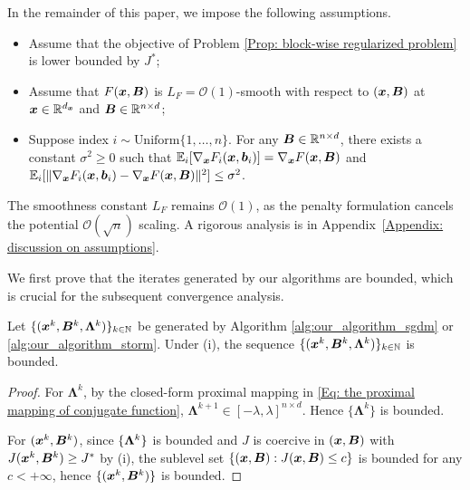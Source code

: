 In the remainder of this paper, we impose the following assumptions.
\begin{assumption} 
\label{Ass: main assumptions}
\begin{itemize}[leftmargin=2em]
    \item[{(i)}] Assume that the objective of Problem \eqref{Prop: block-wise regularized problem} is lower bounded by \(J^*\); 
    \item[{(ii)}] Assume that \(F(\bm{x}, \bm{B})\) is $L_F=\mathcal{O}(1)$-smooth with respect to $(\bm{x}, \bm{B})$ at \(\bm{x} \in \mathbb{R}^{d_{\bm{x}}}\) and \(\bm{B} \in \mathbb{R}^{n\times d}\); 
    \item[{(iii)}] Suppose index $i \sim \text{Uniform}\{1, \ldots, n\}$.  For any \(\bm{B} \in \mathbb{R}^{n\times d}\), there exists a constant $\sigma^2 \geq 0$ such that $\mathbb{E}_{i}[\nabla_{\bm{x}} F_i(\bm{x}, \bm{b}_i)] = \nabla_{\bm{x}} F(\bm{x}, \bm{B})$ and $\mathbb{E}_{i}[\|\nabla_{\bm{x}} F_i(\bm{x}, \bm{b}_i) - \nabla_{\bm{x}} F(\bm{x}, \bm{B})\|^2] \leq \sigma^2$. 
\end{itemize}
\end{assumption}
\begin{remark}
The smoothness constant $L_F$ remains 
$\mathcal{O}(1)$, as the penalty formulation cancels the potential 
$\mathcal{O}(\sqrt{n})$ scaling. A rigorous analysis is in 
Appendix~\ref{Appendix: discussion on assumptions}.
\end{remark}
We first prove that the iterates generated by our algorithms are bounded, which is crucial for the subsequent convergence analysis. 
{\begin{lemma}
\label{lem:bounded-iterates}
Let \(\{(\bm{x}^k,\bm{B}^k,\bm{\Lambda}^k)\}_{k\in\mathbb{N}}\) be generated by Algorithm
\ref{alg:our_algorithm_sgdm} or \ref{alg:our_algorithm_storm}. Under (i), the sequence \(\{(\bm{x}^k,\bm{B}^k,\bm{\Lambda}^k)\}_{k\in\mathbb{N}}\) is bounded.
\end{lemma}
\setcounter{proof}{0}
\begin{proof}
For \(\bm{\Lambda}^k\), by the closed-form proximal mapping in \eqref{Eq: the proximal mapping of conjugate function}, \(\bm{\Lambda}^{k+1}\in[-\lambda,\lambda]^{n\times d}\). Hence \(\{\bm{\Lambda}^k\}\) is bounded.

For $(\bm{x}^k, \bm{B}^k)$, since $\{\bm{\Lambda}^k\}$ is bounded and $J$ is coercive in $(\bm{x}, \bm{B})$ with $J(\bm{x}^k, \bm{B}^k) \geq J^*$ by (i), the sublevel set $\{(\bm{x}, \bm{B}) : J(\bm{x}, \bm{B}) \leq c\}$ is bounded for any $c < +\infty$, hence $\{(\bm{x}^k, \bm{B}^k)\}$ is bounded.
\end{proof}}
